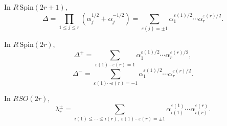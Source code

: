 In $R\,\text{Spin}(2r+1)$,
$$\Delta = \prod_{1 \leq j \leq r} (\alpha_j^{1/2} + \alpha_j^{-1/2}) = \sum_{\varepsilon(j) = \pm 1} \alpha_1^{\varepsilon(1)/2} \cdots \alpha_r^{\varepsilon(r)/2}.$$

In $R\,\text{Spin}(2r)$,
$$\Delta^+ = \sum_{\varepsilon(1) \cdots \varepsilon(r) = 1} \alpha_1^{\varepsilon(1)/2} \cdots \alpha_r^{\varepsilon(r)/2},$$
$$\Delta^- = \sum_{\varepsilon(1) \cdots \varepsilon(r) = -1} \alpha_1^{\varepsilon(1)/2} \cdots \alpha_r^{\varepsilon(r)/2}.$$

In $RSO(2r)$,
$$\lambda_r^\pm = \sum_{i(1) \leq \cdots \leq i(r),\; \varepsilon(1) \cdots \varepsilon(r) = \pm 1} \alpha_{i(1)}^{\varepsilon(1)} \cdots \alpha_{i(r)}^{\varepsilon(r)}.$$
